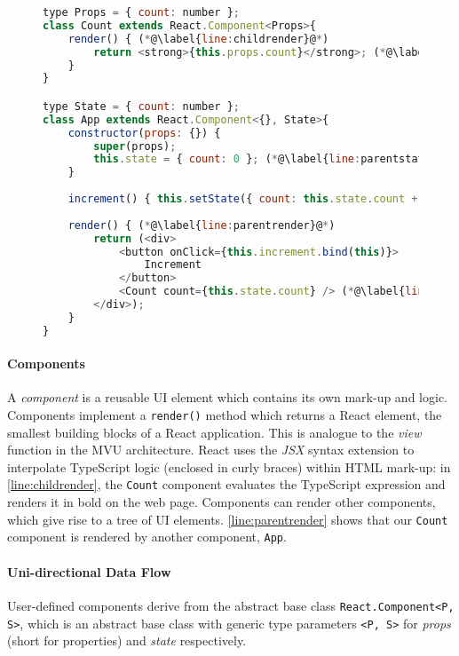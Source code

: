 \begin{figure}[!h]
\begin{lstlisting}[language=javascript,tabsize=2]
type Props = { count: number };
class Count extends React.Component<Props>{
	render() { (*@\label{line:childrender}@*)
		return <strong>{this.props.count}</strong>; (*@\label{line:childprops}@*)
	}
}

type State = { count: number };
class App extends React.Component<{}, State>{
	constructor(props: {}) {
		super(props);
		this.state = { count: 0 }; (*@\label{line:parentstate}@*)
	}
	
	increment() { this.setState({ count: this.state.count + 1 }); (*@\label{line:parentsetstate}@*)
	
	render() { (*@\label{line:parentrender}@*)
		return (<div>
			<button onClick={this.increment.bind(this)}>
				Increment
			</button>
			<Count count={this.state.count} /> (*@\label{line:childcomponent}@*)
		</div>);	
	}
}
\end{lstlisting}
\label{lst:counter}
\end{figure}

\paragraph{Components}
A \textit{component} is a reusable UI element which
contains its own mark-up and logic.
Components implement a \texttt{render()} method which returns
a React element, the smallest building blocks of a React application.
This is analogue to the \textit{view} function in the MVU architecture.
React uses the \textit{JSX} syntax extension \cite{JSX}
to interpolate TypeScript logic 
(enclosed in curly braces)
within HTML mark-up: 
in \cref{line:childrender}, the \texttt{Count} component
evaluates the TypeScript expression 
 and renders it in bold on the web page.
Components can render other components, which give rise to
a tree of UI elements. \cref{line:parentrender} shows that our
\texttt{Count} component is rendered by 
another component, \texttt{App}.

\paragraph{Uni-directional Data Flow}
User-defined components derive from the abstract base class
\texttt{React.Component<P, S>},
which is an abstract base class with generic type parameters
\texttt{<P, S>} for \textit{props} (short for properties) and 
\textit{state} respectively.

